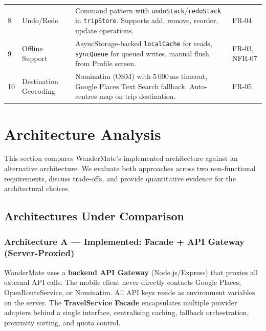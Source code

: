 \documentclass[12pt, a4paper]{article}
\newcommand{\code}[1]{\texttt{\small #1}}
\newcommand{\reqid}[1]{\textsc{\small #1}}
\begin{document}
\begin{longtable}{C{0.5cm} L{3.5cm} L{5.5cm} C{3.5cm}}
8 & Undo/Redo & Command pattern with \code{undoStack}/\code{redoStack} in \code{tripStore}. Supports add, remove, reorder, update operations. & \reqid{FR-04} \\

9 & Offline Support & AsyncStorage-backed \code{localCache} for reads, \code{syncQueue} for queued writes, manual flush from Profile screen. & \reqid{FR-03}, \reqid{NFR-07} \\

10 & Destination Geocoding & Nominatim (OSM) with 5\,000\,ms timeout, Google Places Text Search fallback. Auto-centres map on trip destination. & \reqid{FR-05} \\

\end{longtable}


\section{Architecture Analysis}

This section compares WanderMate's implemented architecture against an alternative architecture. We evaluate both approaches across two non-functional requirements, discuss trade-offs, and provide quantitative evidence for the architectural choices.

\subsection{Architectures Under Comparison}

\subsubsection{Architecture A --- Implemented: Facade + API Gateway (Server-Proxied)}

WanderMate uses a \textbf{backend API Gateway} (Node.js/Express) that proxies all external API calls. The mobile client never directly contacts Google Places, OpenRouteService, or Nominatim. All API keys reside as environment variables on the server. The \textbf{TravelService Facade} encapsulates multiple provider adapters behind a single interface, centralising caching, fallback orchestration, proximity sorting, and quota control.
\end{document}
